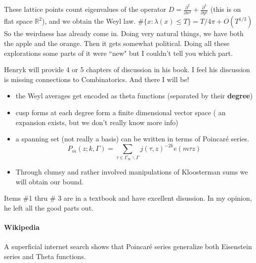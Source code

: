 \documentclass[12pt]{article}
\begin{document}
These lattice points count eigenvalues of the operator $D = \frac{\partial^2 }{\partial x^2} + \frac{\partial^2 }{\partial y^2} $ (this is on flat space $\mathbb{R}^2$), and we obtain the Weyl law.  $\# \{ x : \lambda (x ) \leq T \}  = T/4\pi + O(T^{1/3}) $
\vfill
So the weirdness has already come in.  Doing very natural things, we have both the apple and the orange.  Then it gets somewhat political.  Doing all these explorations some parts of it were ``new" but I couldn't tell you which part. 

\newpage \noindent
Henryk will provide 4 or 5 chapters of discussion in his book.  I feel his discussion is missing connections to Combinatorics.  And there I will be!
\begin{itemize}
\item the Weyl averages get encoded as theta functions (separated by their \textbf{degree})
\item cusp forms at each degree form a finite dimensional vector space ( an expansion exists, but we don't really know more info) 
\item a spanning set (not really a basis) can be written in terms of Poincar\'{e} series. 
$$ P_m(z; k, \Gamma) =  \sum_{\tau  \in \Gamma_\infty \backslash \Gamma }
j(\tau, z)^{-2k} e(m\tau z)  $$
\item Through clumsy and rather involved manipulations of Kloosterman sums we will obtain our bound.
\end{itemize}
Items \#1 thru \# 3 are in a textbook and have excellent disussion.  In my opinion, he left all the good parts out.  \\ \\
{\color{red!50!orange!50!green} \textbf{Wikipedia}} \\ \\
A superficial internet search shows that Poincar\'{e} series generalize both Eisenstein series and Theta functions.  \\ \\
 \\ \\
\end{document}
